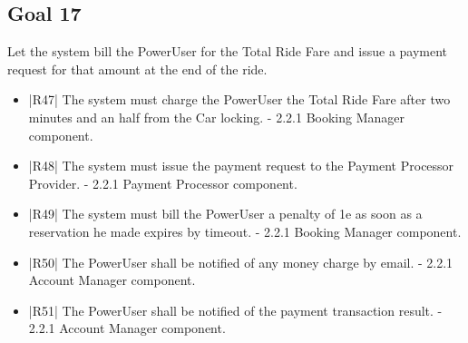 \subsection {Goal 17} Let the system bill the PowerUser for the Total Ride Fare and issue a payment
request for that amount at the end of the ride.
\begin{itemize}
 \item |R47| The system must charge the PowerUser the Total Ride Fare after two minutes
and an half from the Car locking.
    \newline - 2.2.1 Booking Manager component.
 \item |R48| The system must issue the payment request to the Payment Processor Provider.
    \newline - 2.2.1 Payment Processor component.
 \item |R49| The system must bill the PowerUser a penalty of 1e as soon as a reservation
he made expires by timeout.
    \newline - 2.2.1 Booking Manager component.
 \item |R50| The PowerUser shall be notified of any money charge by email.
    \newline - 2.2.1 Account Manager component.
 \item |R51| The PowerUser shall be notified of the payment transaction result.
    \newline - 2.2.1 Account Manager component.
\end{itemize}